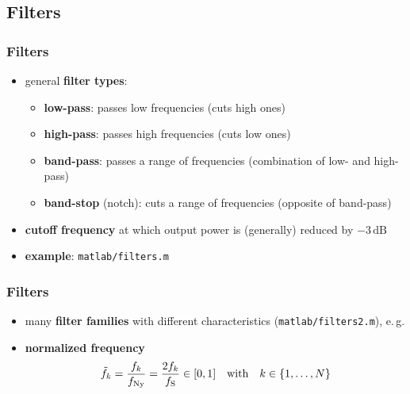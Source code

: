 
\subsection{Filters}

\begin{frame} %
	\frametitle{Filters}
	\begin{itemize}
		\item general \textbf{filter types}:
			\begin{itemize}
				\item \textbf{low-pass}: passes low frequencies (cuts high ones)
				\item \textbf{high-pass}: passes high frequencies (cuts low ones)
				\item \textbf{band-pass}: passes a range of frequencies (combination of low- and high-pass)
				\item \textbf{band-stop} (notch): cuts a range of frequencies (opposite of band-pass)
			\end{itemize}
		\item \textbf{cutoff frequency} at which output power is (generally) reduced by $-3\,\textrm{dB}$
		\item \textbf{example}: \texttt{matlab/filters.m}
			\begin{figure}
				\centering
				\begin{subfigure}[c]{0.48\linewidth}
				\end{subfigure}
				\hspace{0.01\linewidth}
				\begin{subfigure}[c]{0.48\linewidth}
				\end{subfigure}
			\end{figure}
	\end{itemize}
\end{frame}

\begin{frame} %
	\frametitle{Filters}
	\begin{itemize}
		\item many \textbf{filter families} with different characteristics (\texttt{matlab/filters2.m}), e.\,g.
			\begin{figure}
				\centering
				\begin{subfigure}[c]{0.8\linewidth}
				\end{subfigure}
			\end{figure}
		\item \textbf{normalized frequency}
			\begin{align*}
				\tilde f_k=\frac{f_k}{f_{\textrm{Ny}}}=\frac{2f_k}{f_{\textrm S}}\in[0,1]\quad\textrm{with}\quad k\in\{1,\ldots,N\}
			\end{align*}
	\end{itemize}
\end{frame}

